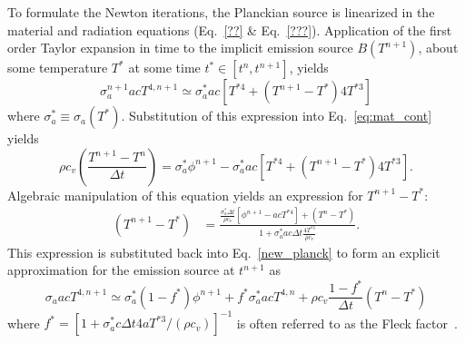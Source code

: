 To formulate the Newton iterations, the Planckian source is linearized in the material and radiation equations (Eq.~\eqref{??}
\& Eq.~\eqref{???}). Application of the first order Taylor expansion in time to the
implicit emission source $B(T^{n+1})$, about some temperature $T^*$ at some
time $t^*\in[t^{n},t^{n+1}]$, yields
\begin{equation}\label{new_planck}
    \sigma_a^{n+1} a c T^{4,n+1} \simeq \sigma_a^* a c \left[T^{*4} + (T^{n+1} - T^*) 4T^{*3} \right]
\end{equation}
where $\sigma_a^*\equiv\sigma_a(T^*)$.  Substitution of this expression into Eq.~\eqref{eq:mat_cont} yields
\begin{equation}
    \rho c_v \left( \frac{T^{n+1} - T^{n}}{\Delta t} \right) = \sigma_a^* \phi^{n+1} -
    \sigma_a^* a c \left[ T^{*4} +  (T^{n+1} - T^*) 4T^{*3} \right].
\end{equation}
Algebraic manipulation of this equation yields an expression for $T^{n+1} - T^{*}$:
\begin{align*}
\left( T^{n+1} - T^* \right) &= \frac{ {\displaystyle \frac{\sigma_a^* \Delta t}{\rho
c_v}}  \left[ \phi^{n+1} -  a c T^{*4} \right] + (T^n - T^*) }{1 +
        \sigma_a^* a c \Delta t\frac{\displaystyle 4
T^{*3}}{\displaystyle \rho c_v } }.
\end{align*}
This expression is substituted back into Eq.~\eqref{new_planck} to form
an explicit approximation for the emission source at $t^{n+1}$ as
\begin{equation}\label{t_next1}
    \sigma_a a c T^{4,n+1} \simeq \sigma_a^* (1 -f^*) \phi^{n+1}
    + f^* \sigma_a^* a c T^{4,n} + \rho c_v\frac{1-f^*}{\Delta t} (T^n - T^*)
\end{equation}
where $f^* = [1 + \sigma_a^* c \Delta t 4 a T^{*3}/(\rho c_v)]^{-1}$ is often referred to
as the Fleck factor~\cite{fnc}. 

